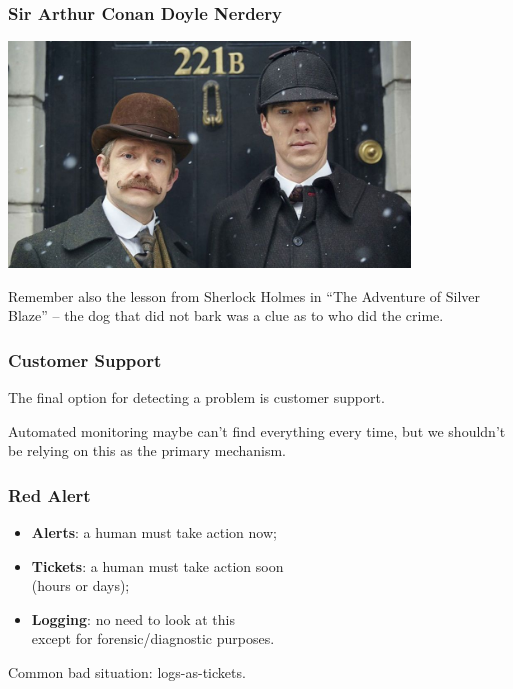 \begin{frame}
\frametitle{Sir Arthur Conan Doyle Nerdery}

\begin{center}
	\includegraphics[width=0.8\textwidth]{images/more-sherlock.jpg}
\end{center}

Remember also the lesson from Sherlock Holmes in ``The Adventure of Silver Blaze'' -- the dog that did \alert{not} bark was a clue as to who did the crime.

\end{frame}


\begin{frame}
\frametitle{Customer Support}

The final option for detecting a problem is customer support.

Automated monitoring maybe can't find everything every time, but we shouldn't be relying on this as the primary mechanism.


\end{frame}


\begin{frame}
\frametitle{Red Alert}


\begin{itemize}
\item {\bf Alerts}: a human must take action now;
\item {\bf Tickets}: a human must take action soon \\ \qquad (hours or days);
\item {\bf Logging}: no need to look at this \\ \qquad except for forensic/diagnostic purposes.
\end{itemize}


Common bad situation: logs-as-tickets.
\end{frame}



